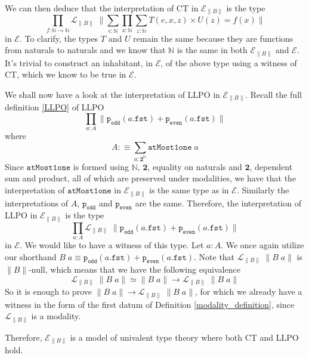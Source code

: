 \documentclass[12pt]{report}
\begin{document}
We can then deduce that the interpretation of CT in $\mathcal{E}_{\lVert B \rVert}$ is the type 
$$\prod_{f : \mathbb{N}\rightarrow \mathbb{N}} \mathcal{L}_{\lVert B \rVert}\;\Big\lVert \sum_{e : \mathbb{N}} \prod_{x : \mathbb{N}} \sum_{z : \mathbb{N}} T(e,x,z) \times U(z) = f(x) \Big\rVert$$
in $\mathcal{E}$. To clarify, the types $T$ and $U$ remain the same because they are functions from naturals to naturals and we know that $\mathbb{N}$ is the same in both $\mathcal{E}_{\lVert B \rVert}$ and $\mathcal{E}$. 
It's trivial to construct an inhabitant, in $\mathcal{E}$, of the above type using a witness of CT, which we know to be true in $\mathcal{E}$. 

We shall now have a look at the interpretation of LLPO in $\mathcal{E}_{\lVert B \rVert}$. 
Recall the full definition \ref{LLPO} of LLPO
$$\prod_{a : A}\lVert \mathtt{p_{odd}}(a.\mathtt{fst}) + \mathtt{p_{even}}(a.\mathtt{fst}) \rVert$$
where $$A :\equiv \sum_{a: \mathbf{2}^\mathbb{N}}\mathtt{atMost1one}\;a$$
Since $\mathtt{atMost1one}$ is formed using $\mathbb{N}$, $\mathbf{2}$, equality on naturals and $\mathbf{2}$, dependent sum and product, all of which are preserved under modalities, we have that the interpretation of $\mathtt{atMost1one}$ in $\mathcal{E}_{\lVert B \rVert}$ is the same type as in $\mathcal{E}$. 
Similarly the interpretations of $A$, $\mathtt{p_{odd}}$ and $\mathtt{p_{even}}$ are the same. 
Therefore, the interpretation of LLPO in $\mathcal{E}_{\lVert B \rVert}$ is the type 
$$\prod_{a : A}\mathcal{L}_{\lVert B \rVert}\;\lVert \mathtt{p_{odd}}(a.\mathtt{fst}) + \mathtt{p_{even}}(a.\mathtt{fst}) \rVert$$
in $\mathcal{E}$. 
We would like to have a witness of this type. 
Let $a : A$. 
We once again utilize our shorthand $B\; a \equiv \mathtt{p_{odd}}(a.\mathtt{fst}) + \mathtt{p_{even}}(a.\mathtt{fst})$. 
Note that $\mathcal{L}_{\lVert B \rVert}\;\lVert B\; a \rVert$ is $\lVert B \rVert$-null, which means that we have the following equivalence
$$\mathcal{L}_{\lVert B \rVert}\; \lVert B\;a\rVert \simeq \lVert B\; a \rVert \rightarrow \mathcal{L}_{\lVert B \rVert}\;\lVert B\; a \rVert$$
So it is enough to prove $\lVert B\; a \rVert \rightarrow \mathcal{L}_{\lVert B \rVert}\;\lVert B\; a \rVert$, for which we already have a witness in the form of the first datum of Definition \ref{modality_definition}, since $\mathcal{L}_{\lVert B \rVert}$ is a modality. 

Therefore, $\mathcal{E}_{\lVert B \rVert}$ is a model of univalent type theory where both CT and LLPO hold.

\printbibliography
\end{document}
